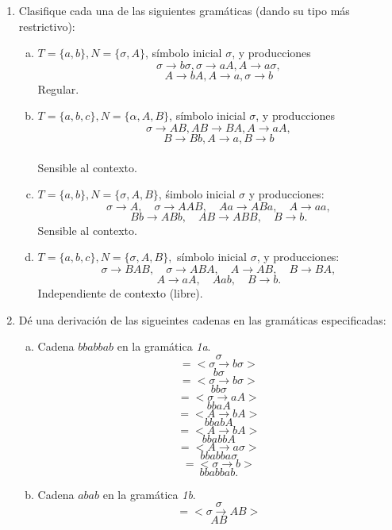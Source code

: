 \documentclass{article}
\begin{document}
\begin{enumerate}[1.]
\item
Clasifique cada una de las siguientes gramáticas (dando su tipo más restrictivo):
  \begin{enumerate}[a)]
    \item
      $T = \{ a,b\}, N = \{ \sigma, A\}$, símbolo inicial $\sigma$, y producciones
      \[ \sigma \rightarrow b\sigma, \sigma \rightarrow aA, A \rightarrow a\sigma,\]
      \[ A \rightarrow bA, A \rightarrow a, \sigma \rightarrow b\]
      Regular.
    \item 
      $T = \{ a,b,c \}, N = \{ \alpha,A,B\}$, símbolo inicial $\sigma$, y producciones
      \[ \sigma \rightarrow AB, AB \rightarrow BA, A \rightarrow aA,\]
      \[ B \rightarrow Bb, A \rightarrow a, B \rightarrow b\] \\
       Sensible al contexto.
    \item
      $T = \{ a,b\}, N = \{ \sigma, A,B\}$, śimbolo inicial $\sigma$ y producciones:
      \[ \sigma \rightarrow A, \quad \sigma \rightarrow AAB,\quad Aa \rightarrow ABa, \quad A \rightarrow aa,\]
      \[ Bb \rightarrow ABb, \quad AB \rightarrow ABB, \quad B \rightarrow b.\]
      Sensible al contexto.
    \item
      $T = \{ a,b,c \}, N = \{\sigma,A,B \},$ símbolo inicial $\sigma$, y producciones:
      \[ \sigma \rightarrow BAB, \quad \sigma \rightarrow ABA, \quad A \rightarrow AB, \quad B \rightarrow BA,\]
      \[A \rightarrow aA, \quad A ab, \quad B \rightarrow b.\]
      Independiente de contexto (libre).
  \end{enumerate}
\item
  Dé una derivación de las sigueintes cadenas en las gramáticas especificadas:
    \begin{enumerate}[a)]
      \item 
        Cadena $bbabbab$ en la gramática \textit{1a}.
        \[ \sigma \]
        \[ = < \sigma \rightarrow b\sigma >\]
        \[ b\sigma \]
        \[ = < \sigma \rightarrow b\sigma > \]
        \[ bb\sigma \]
        \[ = < \sigma \rightarrow aA > \]
        \[ bbaA \]
        \[ = < A \rightarrow bA > \]
        \[ bbabA \]
        \[ = < A \rightarrow bA > \]
        \[ bbabbA \]
        \[ = <A \rightarrow a\sigma> \]
        \[ bbabba\sigma\]
        \[ = <\sigma \rightarrow b> \]
        \[ bbabbab. \]
      \item
        Cadena $abab$ en la gramática \textit{1b}.
        \[ \sigma \]
        \[ = < \sigma \rightarrow AB> \]
        \[ AB \]

\end{enumerate}
\end{enumerate}
\end{document}

